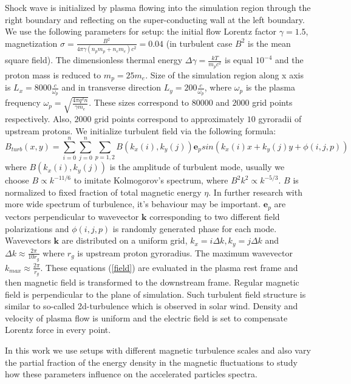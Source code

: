 \documentclass[a4paper]{jpconf}
\begin{document}
Shock wave is initialized by plasma flowing into the simulation region through the right boundary and reflecting on the super-conducting wall at the left boundary. We use the following parameters for setup: the initial flow Lorentz factor $\gamma = 1.5$, magnetization $\sigma = \frac{B^2}{4\pi\gamma (n_p m_p + n_e m_e) c^2} = 0.04$ (in turbulent case $B^2$ is the mean square field). The dimensionless thermal energy $\Delta \gamma = \frac{k T}{m_p c^2}$ is equal $10^{-4}$ and the proton mass is reduced to $m_p = 25 m_e$. Size of the simulation region along x axis is $L_x = 8000\frac{c}{\omega_p}$ and in transverse direction $L_y = 200\frac{c}{\omega_p}$, where $\omega_p$ is the plasma frequency $\omega_p = \sqrt{\frac{4\pi q^2 n}{\gamma m_e}}$. These sizes correspond to $80000$ and $2000$ grid points respectively. Also, $2000$ grid points correspond to approximately $10$ gyroradii of upstream protons.
We initialize turbulent field via the following formula: 
\begin{equation}\label{field}
B_{turb} (x,y) = \sum_{i=0}^{n}\sum_{j=0}^{n}\sum_{p=1,2}B(k_x(i),k_y(j)) \textbf{e}_{p} sin(k_x(i) x + k_y(j) y  + \phi (i,j,p))
\end{equation}
where $B(k_x(i),k_y(j))$ is the amplitude of turbulent mode, usually we choose $B \propto k^{-11/6}$ to imitate Kolmogorov's spectrum, where $B^2 k^2 \propto k^{-5/3}$. $B$ is normalized to fixed fraction of total magnetic energy $\eta$. In further research with more wide spectrum of turbulence, it's behaviour may be important. $\textbf{e}_{p}$ are vectors perpendicular to wavevector $\textbf{k}$ corresponding to two different field polarizations and $\phi (i,j,p)$ is randomly generated phase for each mode. Wavevectors $\textbf{k}$ are distributed on a uniform grid, $k_x = i \Delta k, k_y = j \Delta k$ and $\Delta k \approx \frac{2 \pi}{10 r_g}$ where $r_g$ is upstream proton gyroradius. The maximum wavevector $k_{max} \approx \frac{2 \pi}{r_g}$. These equations (\ref{field}) are evaluated in the plasma rest frame and then magnetic field is transformed to the downstream frame. Regular magnetic field is perpendicular to the plane of simulation. Such turbulent field structure is similar to so-called 2d-turbulence which is observed in solar wind\cite{Matthaeus1990}. Density and velocity of plasma flow is uniform and the electric field is set to compensate Lorentz force in every point.

In this work we use setups with different magnetic turbulence scales and also vary the partial fraction of the energy density in the magnetic fluctuations to study how these parameters influence on the accelerated particles spectra.
\end{document}
